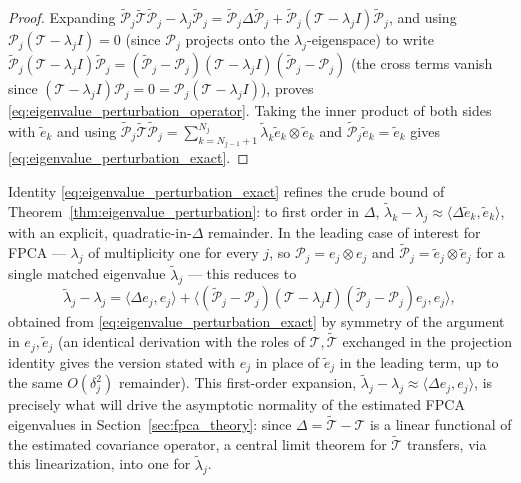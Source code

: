 \begin{proof}
Expanding $\widetilde{\mathcal{P}}_j\widetilde{\mathcal{T}}\widetilde{
\mathcal{P}}_j - \lambda_j\widetilde{\mathcal{P}}_j = \widetilde{
\mathcal{P}}_j\Delta\widetilde{\mathcal{P}}_j + \widetilde{\mathcal{P}}_j
(\mathcal{T}-\lambda_jI)\widetilde{\mathcal{P}}_j$, and using
$\mathcal{P}_j(\mathcal{T}-\lambda_jI)=0$ (since $\mathcal{P}_j$ projects
onto the $\lambda_j$-eigenspace) to write $\widetilde{\mathcal{P}}_j
(\mathcal{T}-\lambda_jI)\widetilde{\mathcal{P}}_j = (\widetilde{
\mathcal{P}}_j-\mathcal{P}_j)(\mathcal{T}-\lambda_jI)(\widetilde{
\mathcal{P}}_j-\mathcal{P}_j)$ (the cross terms vanish since
$(\mathcal{T}-\lambda_jI)\mathcal{P}_j=0=\mathcal{P}_j(\mathcal{T}-
\lambda_jI)$), proves \eqref{eq:eigenvalue_perturbation_operator}. Taking
the inner product of both sides with $\widetilde{e}_k$ and using
$\widetilde{\mathcal{P}}_j\widetilde{\mathcal{T}}\widetilde{\mathcal{P}}_j
= \sum_{k=N_{j-1}+1}^{N_j}\widetilde\lambda_k\widetilde{e}_k\otimes
\widetilde{e}_k$ and $\widetilde{\mathcal{P}}_j\widetilde{e}_k=
\widetilde{e}_k$ gives \eqref{eq:eigenvalue_perturbation_exact}.
\end{proof}

Identity \eqref{eq:eigenvalue_perturbation_exact} refines the crude bound
of Theorem~\ref{thm:eigenvalue_perturbation}: to first order in $\Delta$,
$\widetilde\lambda_k-\lambda_j\approx\langle\Delta\widetilde{e}_k,
\widetilde{e}_k\rangle$, with an explicit, quadratic-in-$\Delta$ remainder.
In the leading case of interest for FPCA --- $\lambda_j$ of multiplicity
one for every $j$, so $\mathcal{P}_j=e_j\otimes e_j$ and
$\widetilde{\mathcal{P}}_j=\widetilde{e}_j\otimes\widetilde{e}_j$ for a
single matched eigenvalue $\widetilde\lambda_j$ --- this reduces to
\begin{equation}
\widetilde\lambda_j - \lambda_j = \langle\Delta e_j,e_j\rangle +
\big\langle(\widetilde{\mathcal{P}}_j-\mathcal{P}_j)(\mathcal{T}-
\lambda_jI)(\widetilde{\mathcal{P}}_j-\mathcal{P}_j)e_j,e_j\big\rangle,
\label{eq:eigenvalue_perturbation_simple}
\end{equation}
obtained from \eqref{eq:eigenvalue_perturbation_exact} by symmetry of the
argument in $e_j,\widetilde{e}_j$ (an identical derivation with the roles
of $\mathcal{T},\widetilde{\mathcal{T}}$ exchanged in the projection
identity gives the version stated with $e_j$ in place of $\widetilde{e}_j$
in the leading term, up to the same $O(\delta_j^2)$ remainder). This
first-order expansion, $\widetilde\lambda_j-\lambda_j\approx\langle\Delta
e_j,e_j\rangle$, is precisely what will drive the asymptotic normality of
the estimated FPCA eigenvalues in Section~\ref{sec:fpca_theory}: since
$\Delta = \widetilde{\mathcal{T}}-\mathcal{T}$ is a linear functional of
the estimated covariance operator, a central limit theorem for
$\widetilde{\mathcal{T}}$ transfers, via this linearization, into one for
$\widetilde\lambda_j$.

